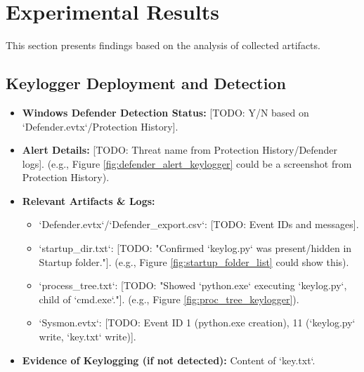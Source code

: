 \documentclass[11pt]{article}
\begin{document}
	\section{Experimental Results}
	This section presents findings based on the analysis of collected artifacts.
	
	\subsection{Keylogger Deployment and Detection}
	\begin{itemize}
		\item \textbf{Windows Defender Detection Status:} [TODO: Y/N based on `Defender.evtx`/Protection History].
		\item \textbf{Alert Details:} [TODO: Threat name from Protection History/Defender logs]. (e.g., Figure \ref{fig:defender_alert_keylogger} could be a screenshot from Protection History).
		\item \textbf{Relevant Artifacts & Logs:}
		\begin{itemize}
			\item `Defender.evtx`/`Defender_export.csv`: [TODO: Event IDs and messages].
			\item `startup_dir.txt`: [TODO: "Confirmed `keylog.py` was present/hidden in Startup folder."]. (e.g., Figure \ref{fig:startup_folder_list} could show this).
			\item `process_tree.txt`: [TODO: "Showed `python.exe` executing `keylog.py`, child of `cmd.exe`."]. (e.g., Figure \ref{fig:proc_tree_keylogger}).
			\item `Sysmon.evtx`: [TODO: Event ID 1 (python.exe creation), 11 (`keylog.py` write, `key.txt` write)].
		\end{itemize}
		\item \textbf{Evidence of Keylogging (if not detected):} Content of `key.txt`.
	\end{itemize}
	
\end{document}
